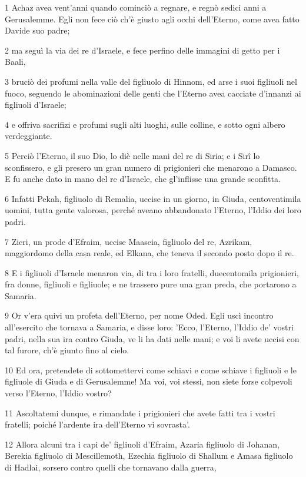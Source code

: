 \par 1 Achaz avea vent'anni quando cominciò a regnare, e regnò sedici anni a Gerusalemme. Egli non fece ciò ch'è giusto agli occhi dell'Eterno, come avea fatto Davide suo padre;
\par 2 ma seguì la via dei re d'Israele, e fece perfino delle immagini di getto per i Baali,
\par 3 bruciò dei profumi nella valle del figliuolo di Hinnom, ed arse i suoi figliuoli nel fuoco, seguendo le abominazioni delle genti che l'Eterno avea cacciate d'innanzi ai figliuoli d'Israele;
\par 4 e offriva sacrifizi e profumi sugli alti luoghi, sulle colline, e sotto ogni albero verdeggiante.
\par 5 Perciò l'Eterno, il suo Dio, lo diè nelle mani del re di Siria; e i Sirî lo sconfissero, e gli presero un gran numero di prigionieri che menarono a Damasco. E fu anche dato in mano del re d'Israele, che gl'inflisse una grande sconfitta.
\par 6 Infatti Pekah, figliuolo di Remalia, uccise in un giorno, in Giuda, centoventimila uomini, tutta gente valorosa, perché aveano abbandonato l'Eterno, l'Iddio dei loro padri.
\par 7 Zicri, un prode d'Efraim, uccise Maaseia, figliuolo del re, Azrikam, maggiordomo della casa reale, ed Elkana, che teneva il secondo posto dopo il re.
\par 8 E i figliuoli d'Israele menaron via, di tra i loro fratelli, duecentomila prigionieri, fra donne, figliuoli e figliuole; e ne trassero pure una gran preda, che portarono a Samaria.
\par 9 Or v'era quivi un profeta dell'Eterno, per nome Oded. Egli uscì incontro all'esercito che tornava a Samaria, e disse loro: 'Ecco, l'Eterno, l'Iddio de' vostri padri, nella sua ira contro Giuda, ve li ha dati nelle mani; e voi li avete uccisi con tal furore, ch'è giunto fino al cielo.
\par 10 Ed ora, pretendete di sottomettervi come schiavi e come schiave i figliuoli e le figliuole di Giuda e di Gerusalemme! Ma voi, voi stessi, non siete forse colpevoli verso l'Eterno, l'Iddio vostro?
\par 11 Ascoltatemi dunque, e rimandate i prigionieri che avete fatti tra i vostri fratelli; poiché l'ardente ira dell'Eterno vi sovrasta'.
\par 12 Allora alcuni tra i capi de' figliuoli d'Efraim, Azaria figliuolo di Johanan, Berekia figliuolo di Mescillemoth, Ezechia figliuolo di Shallum e Amasa figliuolo di Hadlai, sorsero contro quelli che tornavano dalla guerra,
